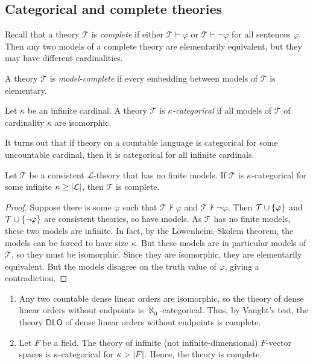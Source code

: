 \subsection{Categorical and complete theories}
Recall that a theory \( \mathcal T \) is \emph{complete} if either \( \mathcal T \vdash \varphi \) or \( \mathcal T \vdash \neg\varphi \) for all sentences \( \varphi \).
Then any two models of a complete theory are elementarily equivalent, but they may have different cardinalities.
\begin{definition}
    A theory \( \mathcal T \) is \emph{model-complete} if every embedding between models of \( \mathcal T \) is elementary.
\end{definition}
\begin{definition}
    Let \( \kappa \) be an infinite cardinal.
    A theory \( \mathcal T \) is \emph{\( \kappa \)-categorical} if all models of \( \mathcal T \) of cardinality \( \kappa \) are isomorphic.
\end{definition}
It turns out that if theory on a countable language is categorical for some uncountable cardinal, then it is categorical for all infinite cardinals.
\begin{proposition}
    Let \( \mathcal T \) be a consistent \( \mathcal L \)-theory that has no finite models.
    If \( \mathcal T \) is \( \kappa \)-categorical for some infinite \( \kappa \geq \abs{\mathcal L} \), then \( \mathcal T \) is complete.
\end{proposition}
\begin{proof}
    Suppose there is some \( \varphi \) such that \( \mathcal T \nvdash \varphi \) and \( \mathcal T \nvdash \neg \varphi \).
    Then \( \mathcal T \cup \qty{\varphi} \) and \( \mathcal T \cup \qty{\neg\varphi} \) are consistent theories, so have models.
    As \( \mathcal T \) has no finite models, these two models are infinite.
    In fact, by the L\"owenheim--Skolem theorem, the models can be forced to have size \( \kappa \).
    But these models are in particular models of \( \mathcal T \), so they must be isomorphic.
    Since they are isomorphic, they are elementarily equivalent.
    But the models disagree on the truth value of \( \varphi \), giving a contradiction.
\end{proof}
\begin{example}
    \begin{enumerate}
        \item Any two countable dense linear orders are isomorphic, so the theory of dense linear orders without endpoints is \( \aleph_0 \)-categorical.
        Thus, by Vaught's test, the theory \( \mathsf{DLO} \) of dense linear orders without endpoints is complete.
        \item Let \( F \) be a field.
        The theory of infinite (not infinite-dimensional) \( F \)-vector spaces is \( \kappa \)-categorical for \( \kappa > \abs{F} \). %
        Hence, the theory is complete.
    \end{enumerate}
\end{example}

